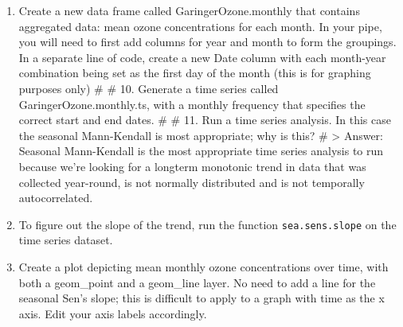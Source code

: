 \documentclass[]{article}
\begin{document}
\begin{enumerate}
\def\labelenumi{\arabic{enumi}.}
\setcounter{enumi}{8}
\item
  Create a new data frame called GaringerOzone.monthly that contains
  aggregated data: mean ozone concentrations for each month. In your
  pipe, you will need to first add columns for year and month to form
  the groupings. In a separate line of code, create a new Date column
  with each month-year combination being set as the first day of the
  month (this is for graphing purposes only) \# \# 10. Generate a time
  series called GaringerOzone.monthly.ts, with a monthly frequency that
  specifies the correct start and end dates. \# \# 11. Run a time series
  analysis. In this case the seasonal Mann-Kendall is most appropriate;
  why is this? \# \textgreater{} Answer: Seasonal Mann-Kendall is the
  most appropriate time series analysis to run because we're looking for
  a longterm monotonic trend in data that was collected year-round, is
  not normally distributed and is not temporally autocorrelated.
\item
  To figure out the slope of the trend, run the function
  \texttt{sea.sens.slope} on the time series dataset.
\item
  Create a plot depicting mean monthly ozone concentrations over time,
  with both a geom\_point and a geom\_line layer. No need to add a line
  for the seasonal Sen's slope; this is difficult to apply to a graph
  with time as the x axis. Edit your axis labels accordingly.
\end{enumerate}
\end{document}
